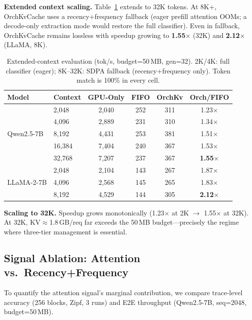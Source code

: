 \documentclass[conference]{IEEEtran}
\begin{document}
\textbf{Extended context scaling.}
\label{sec:scale}
Table~\ref{tab:scale} extends to 32K tokens. At 8K+, OrchKvCache uses a recency+frequency fallback (eager prefill attention OOMs; a decode-only extraction mode would restore the full classifier). Even in fallback, OrchKvCache remains lossless with speedup growing to \textbf{1.55$\times$} (32K) and \textbf{2.12$\times$} (LLaMA, 8K).

\begin{table}[t]
\centering
\caption{Extended-context evaluation (tok/s, budget=50\,MB, gen=32). 2K/4K: full classifier (eager); 8K--32K: SDPA fallback (recency+frequency only). Token match is 100\% in every cell.}
\label{tab:scale}
\footnotesize
\setlength{\tabcolsep}{4pt}
\begin{tabular}{@{}llcccc@{}}
\toprule
Model & Context & GPU-Only & FIFO & OrchKv & Orch/FIFO \\
\midrule
\multirow{5}{*}{Qwen2.5-7B}
& 2{,}048  & 2{,}040 & 252  & 311  & 1.23$\times$ \\
& 4{,}096  & 2{,}889 & 231  & 310  & 1.34$\times$ \\
& 8{,}192  & 4{,}431 & 253  & 381  & 1.51$\times$ \\
& 16{,}384 & 7{,}404 & 240  & 367  & 1.53$\times$ \\
& 32{,}768 & 7{,}207 & 237  & 367  & \textbf{1.55$\times$} \\
\midrule
\multirow{3}{*}{LLaMA-2-7B}
& 2{,}048  & 2{,}104 & 143  & 267  & 1.87$\times$ \\
& 4{,}096  & 2{,}568 & 145  & 265  & 1.83$\times$ \\
& 8{,}192  & 4{,}529 & 144  & 305  & \textbf{2.12$\times$} \\
\bottomrule
\end{tabular}
\end{table}

\textbf{Scaling to 32K.} Speedup grows monotonically (1.23$\times$ at 2K $\to$ 1.55$\times$ at 32K). At 32K, KV$\approx$1.8\,GB/req far exceeds the 50\,MB budget---precisely the regime where three-tier management is essential.

\subsection{Signal Ablation: Attention vs.\ Recency+Frequency}
\label{sec:signal-ablation}

To quantify the attention signal's marginal contribution, we compare trace-level accuracy (256 blocks, Zipf, 3 runs) and E2E throughput (Qwen2.5-7B, seq=2048, budget=50\,MB).
\end{document}
